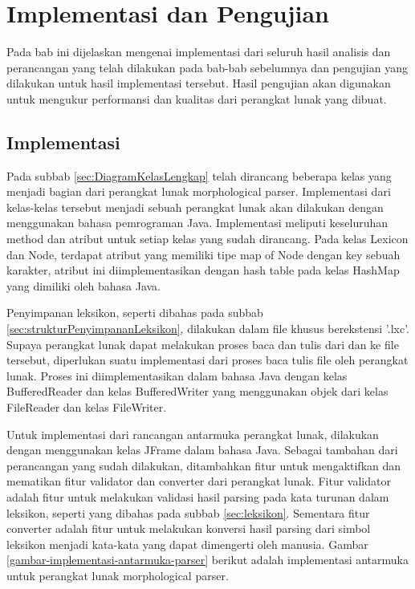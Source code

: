 \chapter{Implementasi dan Pengujian}
\label{chap:implementasiDanPengujian}

Pada bab ini dijelaskan mengenai implementasi dari seluruh hasil analisis dan perancangan yang telah dilakukan pada bab-bab sebelumnya dan pengujian yang dilakukan untuk hasil implementasi tersebut. Hasil pengujian akan digunakan untuk mengukur performansi dan kualitas dari perangkat lunak yang dibuat.

\section{Implementasi}
\label{sec:implementasi}

Pada subbab \ref{sec:DiagramKelasLengkap} telah dirancang beberapa kelas yang menjadi bagian dari perangkat lunak morphological parser. Implementasi dari kelas-kelas tersebut menjadi sebuah perangkat lunak akan dilakukan dengan menggunakan bahasa pemrograman Java. Implementasi meliputi keseluruhan method dan atribut untuk setiap kelas yang sudah dirancang. Pada kelas Lexicon dan Node, terdapat atribut yang memiliki tipe map of Node dengan key sebuah karakter, atribut ini diimplementasikan dengan hash table pada kelas HashMap yang dimiliki oleh bahasa Java.

Penyimpanan leksikon, seperti dibahas pada subbab \ref{sec:strukturPenyimpananLeksikon}, dilakukan dalam file khusus berekstensi '.lxc'. Supaya perangkat lunak dapat melakukan proses baca dan tulis dari dan ke file tersebut, diperlukan suatu implementasi dari proses baca tulis file oleh perangkat lunak. Proses ini diimplementasikan dalam bahasa Java dengan kelas BufferedReader dan kelas BufferedWriter yang menggunakan objek dari kelas FileReader dan kelas FileWriter.

Untuk implementasi dari rancangan antarmuka perangkat lunak, dilakukan dengan menggunakan kelas JFrame dalam bahasa Java. Sebagai tambahan dari perancangan yang sudah dilakukan, ditambahkan fitur untuk mengaktifkan dan mematikan fitur validator dan converter dari perangkat lunak. Fitur validator adalah fitur untuk melakukan validasi hasil parsing pada kata turunan dalam leksikon, seperti yang dibahas pada subbab \ref{sec:leksikon}. Sementara fitur converter adalah fitur untuk melakukan konversi hasil parsing dari simbol leksikon menjadi kata-kata yang dapat dimengerti oleh manusia. Gambar \ref{gambar-implementasi-antarmuka-parser} berikut adalah implementasi antarmuka untuk perangkat lunak morphological parser.


